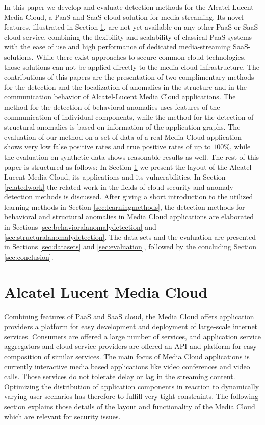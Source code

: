 \documentclass{llncs}
\begin{document}
In this paper we develop and evaluate detection methods for the Alcatel-Lucent Media Cloud, a PaaS and SaaS cloud solution for media streaming. Its novel features, illustrated in Section \ref{alcatellucentmediacloud}, are not yet available on any other PaaS or SaaS cloud service, combining the flexibility and scalability of classical PaaS systems with the ease of use and high performance of dedicated media-streaming SaaS-solutions. While there exist approaches to secure common cloud technologies, those solutions can not be applied directly to the media cloud infrastructure. 
The contributions of this papers are the presentation of two complimentary methods for the detection and the localization of anomalies in the structure and in the communication behavior of Alcatel-Lucent Media Cloud applications. The method for the detection of behavioral anomalies uses features of the communication of individual components, while the method for the detection of structural anomalies is based on information of the application graphs. The evaluation of our method on a set of data of a real Media Cloud application shows very low false positive rates and true positive rates of up to $100\%$, while the evaluation on synthetic data shows reasonable results as well.
The rest of this paper is structured as follows: In Section \ref{alcatellucentmediacloud} we present the layout of the Alcatel-Lucent Media Cloud, its applications and its vulnerabilities. In Section \ref{relatedwork} the related work in the fields of cloud security and anomaly detection methods is discussed. After giving a short introduction to the utilized learning methods in Section \ref{sec:learningmethods}, the detection methods for behavioral and structural anomalies in Media Cloud applications are elaborated in Sections \ref{sec:behavioralanomalydetection} and \ref{sec:structuralanomalydetection}. The data sets and the evaluation are presented in Sections \ref{sec:datasets} and \ref{sec:evaluation}, followed by the concluding Section \ref{sec:conclusion}.
 
\section{Alcatel Lucent Media Cloud}
\label{alcatellucentmediacloud}
Combining features of PaaS and SaaS cloud, the Media Cloud offers application providers a platform for easy development and deployment of large-scale internet services. Consumers are offered a large number of services, and application service aggregators and cloud service providers are offered an API and platform for easy composition of similar services. The main focus of Media Cloud applications is currently interactive media based applications like video conferences and video calls. Those services do not tolerate delay or lag in the streaming content. Optimizing the distribution of application components in reaction to dynamically varying user scenarios has therefore to fulfill very tight constraints. The following section explains those details of the layout and functionality of the Media Cloud which are relevant for security issues.
\end{document}
